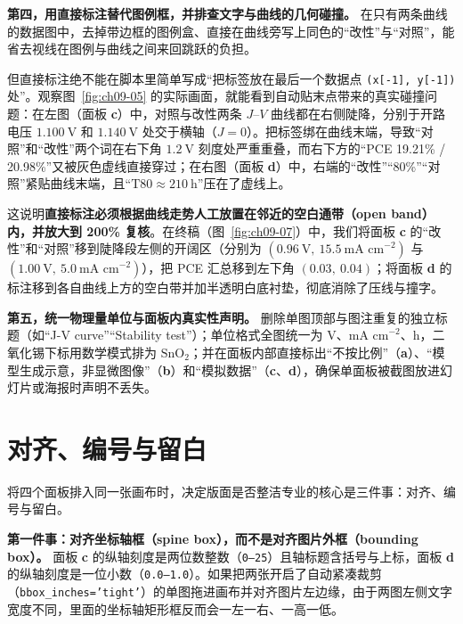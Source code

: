 \textbf{第四，用直接标注替代图例框，并排查文字与曲线的几何碰撞。}
在只有两条曲线的数据图中，去掉带边框的图例盒、直接在曲线旁写上同色的“改性”与“对照”，能省去视线在图例与曲线之间来回跳跃的负担。

但直接标注绝不能在脚本里简单写成“把标签放在最后一个数据点 \texttt{(x[-1], y[-1])} 处”。观察图~\ref{fig:ch09-05} 的实际画面，就能看到自动贴末点带来的真实碰撞问题：在左图（面板 \textbf{c}）中，对照与改性两条 $J\text{--}V$ 曲线都在右侧陡降，分别于开路电压 $1.100\ \text{V}$ 和 $1.140\ \text{V}$ 处交于横轴（$J = 0$）。把标签绑在曲线末端，导致“对照”和“改性”两个词在右下角 $1.2\ \text{V}$ 刻度处严重重叠，而右下方的“PCE 19.21\% / 20.98\%”又被灰色虚线直接穿过；在右图（面板 \textbf{d}）中，右端的“改性”“80\%”“对照”紧贴曲线末端，且“$\text{T80} \approx 210\ \text{h}$”压在了虚线上。

这说明\textbf{直接标注必须根据曲线走势人工放置在邻近的空白通带（open band）内，并放大到 200\% 复核}。在终稿（图~\ref{fig:ch09-07}）中，我们将面板 \textbf{c} 的“改性”和“对照”移到陡降段左侧的开阔区（分别为 $(0.96\ \text{V},\ 15.5\ \text{mA cm}^{-2})$ 与 $(1.00\ \text{V},\ 5.0\ \text{mA cm}^{-2})$），把 PCE 汇总移到左下角 $(0.03,\ 0.04)$；将面板 \textbf{d} 的标注移到各自曲线上方的空白带并加半透明白底衬垫，彻底消除了压线与撞字。

\textbf{第五，统一物理量单位与面板内真实性声明。}
删除单图顶部与图注重复的独立标题（如“J-V curve”“Stability test”）；单位格式全图统一为 $\text{V}$、$\text{mA cm}^{-2}$、$\text{h}$，二氧化锡下标用数学模式排为 $\mathrm{SnO_2}$；并在面板内部直接标出“不按比例”（\textbf{a}）、“模型生成示意，非显微图像”（\textbf{b}）和“模拟数据”（\textbf{c}、\textbf{d}），确保单面板被截图放进幻灯片或海报时声明不丢失。

\section{对齐、编号与留白}

将四个面板排入同一张画布时，决定版面是否整洁专业的核心是三件事：对齐、编号与留白。

\textbf{第一件事：对齐坐标轴框（spine box），而不是对齐图片外框（bounding box）。}
面板 \textbf{c} 的纵轴刻度是两位数整数（\texttt{0–25}）且轴标题含括号与上标，面板 \textbf{d} 的纵轴刻度是一位小数（\texttt{0.0–1.0}）。如果把两张开启了自动紧凑裁剪（\texttt{bbox\_inches='tight'}）的单图拖进画布并对齐图片左边缘，由于两图左侧文字宽度不同，里面的坐标轴矩形框反而会一左一右、一高一低。

